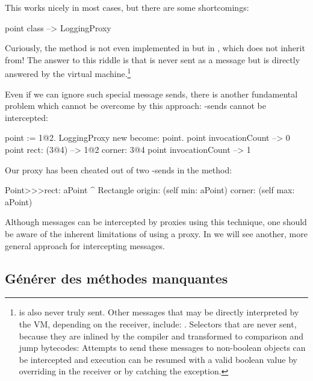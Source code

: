 \documentclass[a4paper,10pt,twoside]{book}
\begin{document}
This works nicely in most cases, but there are some shortcomings:
\begin{code}{}
point class --> LoggingProxy
\end{code}
Curiously, the method  is not even implemented in  but in , which  does not inherit from!
The answer to this riddle is that  is never sent as a message but is directly answered by the virtual machine.\footnote{ is also never truly sent.
Other messages that may be directly interpreted by the VM, depending on the receiver, include:
\ct{+- < > <= >= = ~= * / \ ==}
.
Selectors that are never sent, because they are inlined by the compiler and transformed to comparison and jump bytecodes:
Attempts to send these messages to non-boolean objects can be intercepted and execution can be resumed with a valid boolean value by overriding  in the receiver or by catching the  exception.
}%

Even if we can ignore such special message sends, there is another fundamental problem which cannot be overcome by this approach: \self-sends cannot be intercepted:
\begin{code}{}
point := 1@2.
LoggingProxy new become: point.
point invocationCount --> 0
point rect: (3@4)        --> 1@2 corner: 3@4
point invocationCount --> 1
\end{code}

Our proxy has been cheated out of two \self-sends in the  method:
\begin{code}{}
Point>>>rect: aPoint 
	^ Rectangle  origin: (self min: aPoint) corner: (self max: aPoint)
\end{code}

Although messages can be intercepted by proxies using this technique, one should be aware of the inherent limitations of using a proxy.  In  we will see another, more general approach for intercepting messages.

\subsection{Générer des méthodes manquantes}
\end{document}
